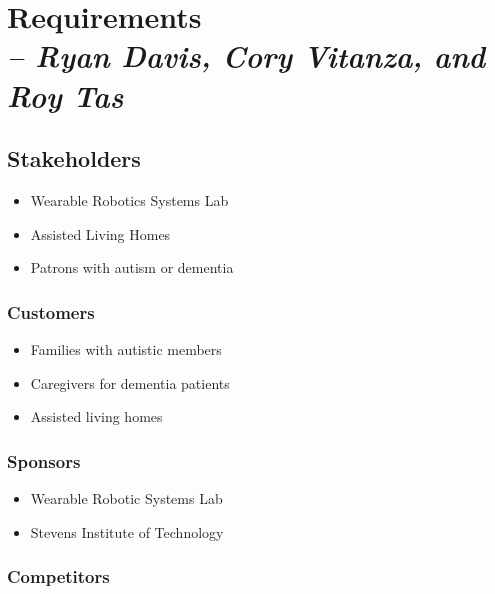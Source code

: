 \chapter{Requirements \\
\small{\textit{-- Ryan Davis, Cory Vitanza, and Roy Tas}}
\label{Chapter::Requirements}}

\section{Stakeholders}
\begin{itemize}
    \item Wearable Robotics Systems Lab
    \item Assisted Living Homes
    \item Patrons with autism or dementia
\end{itemize}

\subsection{Customers} 
\begin{itemize}
    \item Families with autistic members
    \item Caregivers for dementia patients
    \item Assisted living homes
\end{itemize}

\subsection{Sponsors}
\begin{itemize}
    \item Wearable Robotic Systems Lab
    \item Stevens Institute of Technology
\end{itemize}

\subsection{Competitors} 
\begin{table}[H]
\centering
{}
\caption{Comparison of Elderly and Autism Tracking Devices}
\label{tab:tracking_devices}
\end{table}

